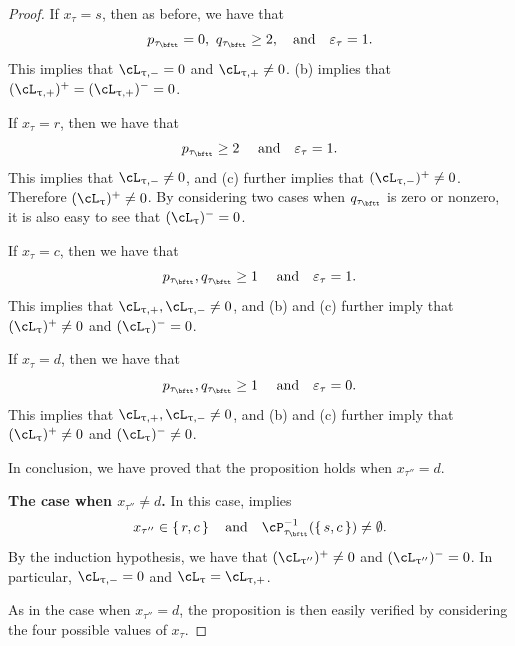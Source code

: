 \documentclass[11pt,a4paper]{amsart}
\newcommand{\be}{\begin {equation}}
\newcommand{\ee}{\end {equation}}
\numberwithin{equation}{section}
\theoremstyle{remark}
\def\ac{\cL}
\begin{document}
\begin{proof}
If  $x_\tau=s$, then as before, we have that 
\[
p_{\tau_\bftt}=0,\  q_{\tau_\bftt}\geq 2,\quad \textrm{and}\quad  \varepsilon_\tau=1.
\]
This implies that $\ac_{\uptau,-}=0$ and $\ac_{\uptau,+}\neq 0$.  (b) implies that 
$(\ac_{\uptau,+})^+=(\ac_{\uptau,+})^-=0$. 

If  $x_\tau=r$, then we have that
\[
p_{\tau_\bftt}\geq 2\  \quad \textrm{and}\quad  \varepsilon_\tau=1.
\]
This implies that $\ac_{\uptau,-}\neq 0$, and  (c) further implies that $(\ac_{\uptau,-})^+\neq 0$. 
Therefore  $(\ac_{\uptau})^+\neq 0$. By considering two cases when $q_{\tau_\bftt}$ is zero or nonzero, it is also easy to see that $(\ac_{\uptau})^-= 0$. 

If  $x_\tau=c$, then we have that
\[
p_{\tau_\bftt}, q_{\tau_\bftt}\geq 1\  \quad \textrm{and}\quad  \varepsilon_\tau=1.
\]
This implies that $\ac_{\uptau,+},\ac_{\uptau,-}\neq 0$, and  (b) and (c) further imply that $(\ac_{\uptau})^+\neq 0$ and $(\ac_{\uptau})^-= 0$.  

If  $x_\tau=d$, then we have that
\[
p_{\tau_\bftt}, q_{\tau_\bftt}\geq 1\  \quad \textrm{and}\quad  \varepsilon_\tau=0.
\]
This implies that $\ac_{\uptau,+},\ac_{\uptau,-}\neq 0$, and  (b) and (c) further imply that $(\ac_{\uptau})^+\neq 0$ and $(\ac_{\uptau})^-\neq 0$.  

In conclusion, we have proved that  the proposition holds when $x_{\tau''}=d$.

{\bf The case when  $x_{\tau''}\neq d$.} In this case,   implies 
\be\label{taunotd}
x_{\tau''}\in \set{r,c}\quad\textrm{and}\quad 
    \cP_{\tau_\bftt}^{-1}(\set{s,c})\neq \emptyset.
    \ee
    By the induction hypothesis, we have that $(\ac_{\uptau''})^+\neq 0$ and $(\ac_{\uptau''})^-= 0$. 
     In particular, $\ac_{\uptau,-}=0$ and $\ac_\uptau=\ac_{\uptau,+}$. 
    
    As in the case when $x_{\tau''}=d$, the proposition is then  easily verified by considering the four possible values of $x_\tau$. 
\end{proof}


 
\end{document}
